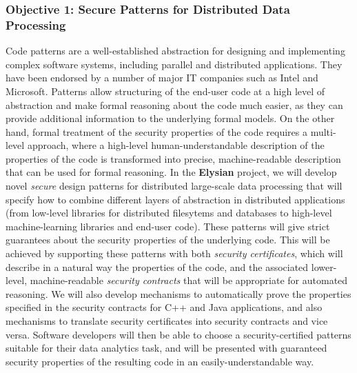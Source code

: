 \documentclass[a4paper,11pt]{article}
\newcommand{\project}[1]{\textbf{#1}\xspace}
\newcommand{\SECURITY}{\project{Elysian}}
\newcommand{\TheProject}{\SECURITY}
\begin{document}
\subsubsection*{Objective 1: Secure Patterns for Distributed Data Processing}
\vspace{-6pt}
Code patterns are a well-established abstraction for designing and implementing complex software systems, including parallel and distributed applications.  They have been endorsed by a number of major IT companies such as Intel and Microsoft. Patterns allow structuring of the end-user code at a high level of abstraction and make formal reasoning about the code much easier, as they can provide additional information to the underlying formal models. On the other hand, formal treatment of the security properties of the code requires a multi-level approach, where a high-level human-understandable description of the properties of the code is transformed into precise, machine-readable description that can be used for formal reasoning. In the \TheProject{} project, we will develop novel \emph{secure} design patterns for distributed large-scale data processing that will specify how to combine different layers of abstraction in distributed applications (from low-level libraries for distributed filesytems and databases to high-level machine-learning libraries and end-user code). These patterns will give strict guarantees about the security properties of the underlying code. This will be achieved by supporting these patterns with both \emph{security certificates}, which will describe in a natural way the properties of the code, and the associated lower-level, machine-readable \emph{security contracts} that will be appropriate for automated reasoning. We will also develop mechanisms to automatically prove the properties specified in the security contracts for C++ and Java applications, and also mechanisms to translate security certificates into security contracts and vice versa. Software developers will then be able to choose a security-certified patterns suitable for their data analytics task, and will be presented with guaranteed security properties of the resulting code in an easily-understandable way. 
\end{document}
